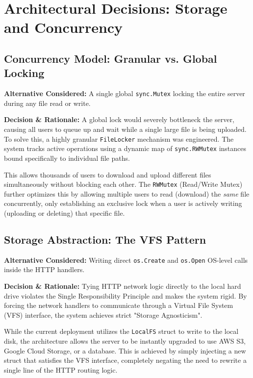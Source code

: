 \documentclass[12pt, a4paper]{article}
\begin{document}
\section{Architectural Decisions: Storage and Concurrency}

\subsection{Concurrency Model: Granular vs. Global Locking}
\textbf{Alternative Considered:} A single global \texttt{sync.Mutex} locking the entire server during any file read or write.

\textbf{Decision \& Rationale:} A global lock would severely bottleneck the server, causing all users to queue up and wait while a single large file is being uploaded. To solve this, a highly granular \texttt{FileLocker} mechanism was engineered. The system tracks active operations using a dynamic map of \texttt{sync.RWMutex} instances bound specifically to individual file paths. 

This allows thousands of users to download and upload different files simultaneously without blocking each other. The \texttt{RWMutex} (Read/Write Mutex) further optimizes this by allowing multiple users to read (download) the \emph{same} file concurrently, only establishing an exclusive lock when a user is actively writing (uploading or deleting) that specific file.

\subsection{Storage Abstraction: The VFS Pattern}
\textbf{Alternative Considered:} Writing direct \texttt{os.Create} and \texttt{os.Open} OS-level calls inside the HTTP handlers.

\textbf{Decision \& Rationale:} Tying HTTP network logic directly to the local hard drive violates the Single Responsibility Principle and makes the system rigid. By forcing the network handlers to communicate through a Virtual File System (VFS) interface, the system achieves strict "Storage Agnosticism". 

While the current deployment utilizes the \texttt{LocalFS} struct to write to the local disk, the architecture allows the server to be instantly upgraded to use AWS S3, Google Cloud Storage, or a database. This is achieved by simply injecting a new struct that satisfies the VFS interface, completely negating the need to rewrite a single line of the HTTP routing logic.
\end{document}
